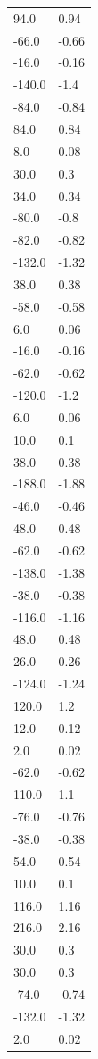 \begin{longtable}{ll}
94.0 & 0.94 \\
-66.0 & -0.66 \\
-16.0 & -0.16 \\
-140.0 & -1.4 \\
-84.0 & -0.84 \\
84.0 & 0.84 \\
8.0 & 0.08 \\
30.0 & 0.3 \\
34.0 & 0.34 \\
-80.0 & -0.8 \\
-82.0 & -0.82 \\
-132.0 & -1.32 \\
38.0 & 0.38 \\
-58.0 & -0.58 \\
6.0 & 0.06 \\
-16.0 & -0.16 \\
-62.0 & -0.62 \\
-120.0 & -1.2 \\
6.0 & 0.06 \\
10.0 & 0.1 \\
38.0 & 0.38 \\
-188.0 & -1.88 \\
-46.0 & -0.46 \\
48.0 & 0.48 \\
-62.0 & -0.62 \\
-138.0 & -1.38 \\
-38.0 & -0.38 \\
-116.0 & -1.16 \\
48.0 & 0.48 \\
26.0 & 0.26 \\
-124.0 & -1.24 \\
120.0 & 1.2 \\
12.0 & 0.12 \\
2.0 & 0.02 \\
-62.0 & -0.62 \\
110.0 & 1.1 \\
-76.0 & -0.76 \\
-38.0 & -0.38 \\
54.0 & 0.54 \\
10.0 & 0.1 \\
116.0 & 1.16 \\
216.0 & 2.16 \\
30.0 & 0.3 \\
30.0 & 0.3 \\
-74.0 & -0.74 \\
-132.0 & -1.32 \\
2.0 & 0.02 \\

\end{longtable}
